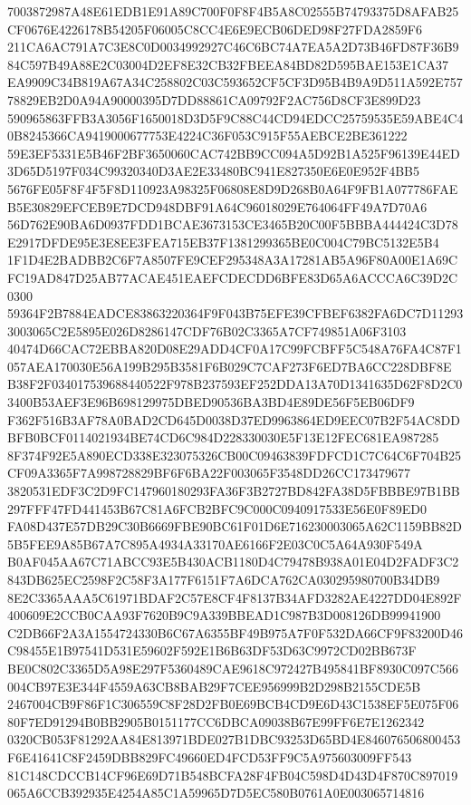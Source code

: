 \documentclass[UTF8,fontset=fandol,zihao=-4,a4paper]{ctexart}
\begin{document}
{{7003872987A48E61EDB1E91A89C700F0F8F4B5A8C02555B74793375D8AFAB25CF0676E4226178B54205F06005C8CC4E6E9ECB06DED98F27FDA2859F6
211CA6AC791A7C3E8C0D0034992927C46C6BC74A7EA5A2D73B46FD87F36B984C597B49A88E2C03004D2EF8E32CB32FBEEA84BD82D595BAE153E1CA37
EA9909C34B819A67A34C258802C03C593652CF5CF3D95B4B9A9D511A592E75778829EB2D0A94A90000395D7DD88861CA09792F2AC756D8CF3E899D23
590965863FFB3A3056F1650018D3D5F9C88C44CD94EDCC25759535E59ABE4C40B8245366CA9419000677753E4224C36F053C915F55AEBCE2BE361222
59E3EF5331E5B46F2BF3650060CAC742BB9CC094A5D92B1A525F96139E44ED3D65D5197F034C99320340D3AE2E33480BC941E827350E6E0E952F4BB5
5676FE05F8F4F5F8D110923A98325F06808E8D9D268B0A64F9FB1A077786FAEB5E30829EFCEB9E7DCD948DBF91A64C96018029E764064FF49A7D70A6
56D762E90BA6D0937FDD1BCAE3673153CE3465B20C00F5BBBA444424C3D78E2917DFDE95E3E8EE3FEA715EB37F1381299365BE0C004C79BC5132E5B4
1F1D4E2BADBB2C6F7A8507FE9CEF295348A3A17281AB5A96F80A00E1A69CFC19AD847D25AB77ACAE451EAEFCDECDD6BFE83D65A6ACCCA6C39D2C0300
59364F2B7884EADCE83863220364F9F043B75EFE39CFBEF6382FA6DC7D112933003065C2E5895E026D8286147CDF76B02C3365A7CF749851A06F3103
40474D66CAC72EBBA820D08E29ADD4CF0A17C99FCBFF5C548A76FA4C87F1057AEA170030E56A199B295B3581F6B029C7CAF273F6ED7BA6CC228DBF8E
B38F2F034017539688440522F978B237593EF252DDA13A70D1341635D62F8D2C03400B53AEF3E96B698129975DBED90536BA3BD4E89DE56F5EB06DF9
F362F516B3AF78A0BAD2CD645D0038D37ED9963864ED9EEC07B2F54AC8DDBFB0BCF0114021934BE74CD6C984D228330030E5F13E12FEC681EA987285
8F374F92E5A890ECD338E323075326CB00C09463839FDFCD1C7C64C6F704B25CF09A3365F7A998728829BF6F6BA22F003065F3548DD26CC173479677
3820531EDF3C2D9FC147960180293FA36F3B2727BD842FA38D5FBBBE97B1BB297FFF47FD441453B67C81A6FCB2BFC9C000C0940917533E56E0F89ED0
FA08D437E57DB29C30B6669FBE90BC61F01D6E716230003065A62C1159BB82D5B5FEE9A85B67A7C895A4934A33170AE6166F2E03C0C5A64A930F549A
B0AF045AA67C71ABCC93E5B430ACB1180D4C79478B938A01E04D2FADF3C2843DB625EC2598F2C58F3A177F6151F7A6DCA762CA030295980700B34DB9
8E2C3365AAA5C61971BDAF2C57E8CF4F8137B34AFD3282AE4227DD04E892F400609E2CCB0CAA93F7620B9C9A339BBEAD1C987B3D008126DB99941900
C2DB66F2A3A1554724330B6C67A6355BF49B975A7F0F532DA66CF9F83200D46C98455E1B97541D531E59602F592E1B6B63DF53D63C9972CD02BB673F
BE0C802C3365D5A98E297F5360489CAE9618C972427B495841BF8930C097C566004CB97E3E344F4559A63CB8BAB29F7CEE956999B2D298B2155CDE5B
2467004CB9F86F1C306559C8F28D2FB0E69BCB4CD9E6D43C1538EF5E075F0680F7ED91294B0BB2905B0151177CC6DBCA09038B67E99FF6E7E1262342
0320CB053F81292AA84E813971BDE027B1DBC93253D65BD4E846076506800453F6E41641C8F2459DBB829FC49660ED4FCD53FF9C5A975603009FF543
81C148CDCCB14CF96E69D71B548BCFA28F4FB04C598D4D43D4F870C897019065A6CCB392935E4254A85C1A59965D7D5EC580B0761A0E003065714816
}}
\end{document}
